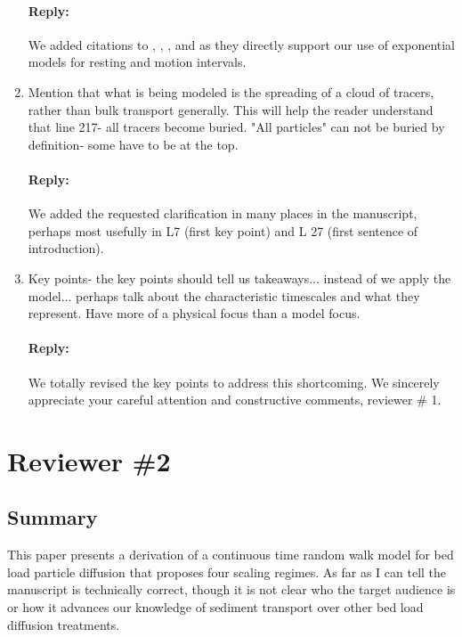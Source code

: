 \documentclass[11pt]{article}
\begin{document}
\begin{enumerate}
\paragraph{Reply:} We added citations to \citet{Fathel2015}, \cite{Furbish2016}, \citet{Roseberry2012}, and \citet{Furbish2012b} as they directly support our use of exponential models for resting and motion intervals.

\item Mention that what is being modeled is the spreading of a cloud of tracers, rather than bulk transport generally. This will help the reader understand that line 217- all tracers become buried. "All particles" can not be buried by definition- some have to be at the top.
\paragraph{Reply:} We added the requested clarification in many places in the manuscript, perhaps most usefully in L7 (first key point) and L 27 (first sentence of introduction). 

\item Key points- the key points should tell us takeaways... instead of we apply the model... perhaps talk about the characteristic timescales and what they represent. Have more of a physical focus than a model focus.
\paragraph{Reply:} 

We totally revised the key points to address this shortcoming. We sincerely appreciate your careful attention and constructive comments, reviewer \# 1.
\end{enumerate}

\section*{Reviewer \#2}
\subsection*{Summary}
This paper presents a derivation of a continuous time random walk model for bed load particle diffusion that proposes four scaling regimes. As far as I can tell the manuscript is technically correct, though it is not clear who the target audience is or how it advances our knowledge of sediment transport over other bed load diffusion treatments.
\end{document}
